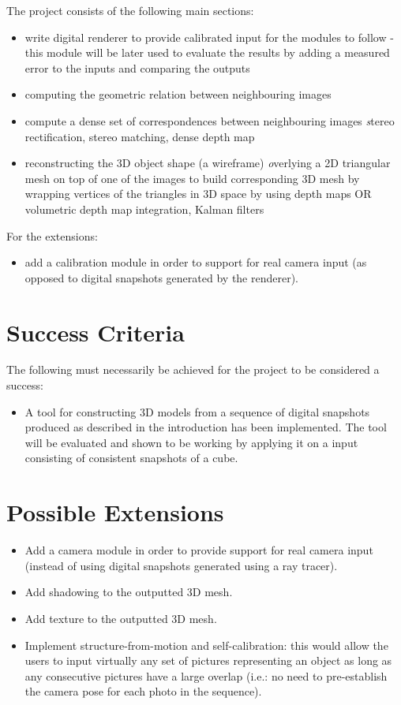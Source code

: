 The project consists of the following main sections:
\begin{itemize}
\item write digital renderer to provide calibrated input for the modules to follow - this module will be later used to evaluate the results by adding a measured error to the inputs and comparing the outputs
\item computing the geometric relation between neighbouring images
\item compute a dense set of correspondences between neighbouring images
{\emph stereo rectification, stereo matching, dense depth map}
\item reconstructing the 3D object shape (a wireframe)
{\emph overlying a 2D triangular mesh on top of one of the images to build corresponding 3D mesh by wrapping vertices of the triangles in 3D space by using depth maps OR volumetric depth map integration, Kalman filters}
\end{itemize}
For the extensions:
\begin{itemize}
\item add a calibration module in order to support for real camera input (as opposed to digital snapshots generated by the renderer).  
\end{itemize}

\section*{Success Criteria}
The following must necessarily be achieved for the project to be considered a success:
\begin{itemize}
\item A tool for constructing 3D models from a sequence of digital snapshots produced as described in the introduction has been implemented. The tool will be evaluated and shown to be working by applying it on a input consisting of consistent snapshots of a cube.
\end{itemize}

\section*{Possible Extensions}
\begin{itemize}
\item Add a camera module in order to provide support for real camera input (instead of using digital snapshots generated using a ray tracer).
\item Add shadowing to the outputted 3D mesh. 
\item Add texture to the outputted 3D mesh.
\item Implement structure-from-motion and self-calibration: this would allow the users to input virtually any set of pictures representing an object as long as any consecutive pictures have a large overlap (i.e.: no need to pre-establish the camera pose for each photo in the sequence).
\end{itemize}

